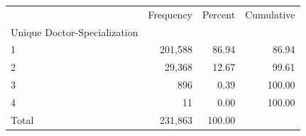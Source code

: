 \documentclass{article}
\begin{document}
\begin{table}[!h]
\centering
\begin{tabular}{llll}
\cline{1-4}
\multicolumn{1}{c}{} &
  \multicolumn{1}{r}{Frequency} &
  \multicolumn{1}{r}{Percent} &
  \multicolumn{1}{r}{Cumulative} \\
\cline{1-4}
\multicolumn{1}{l}{Unique Doctor-Specialization} &
  \multicolumn{1}{r}{} &
  \multicolumn{1}{r}{} &
  \multicolumn{1}{r}{} \\
\multicolumn{1}{l}{\hspace{1em}1} &
  \multicolumn{1}{r}{201,588} &
  \multicolumn{1}{r}{86.94} &
  \multicolumn{1}{r}{86.94} \\
\multicolumn{1}{l}{\hspace{1em}2} &
  \multicolumn{1}{r}{29,368} &
  \multicolumn{1}{r}{12.67} &
  \multicolumn{1}{r}{99.61} \\
\multicolumn{1}{l}{\hspace{1em}3} &
  \multicolumn{1}{r}{896} &
  \multicolumn{1}{r}{0.39} &
  \multicolumn{1}{r}{100.00} \\
\multicolumn{1}{l}{\hspace{1em}4} &
  \multicolumn{1}{r}{11} &
  \multicolumn{1}{r}{0.00} &
  \multicolumn{1}{r}{100.00} \\
\multicolumn{1}{l}{\hspace{1em}Total} &
  \multicolumn{1}{r}{231,863} &
  \multicolumn{1}{r}{100.00} &
  \multicolumn{1}{r}{} \\
\cline{1-4}
\end{tabular}
\end{table}
\end{document}
